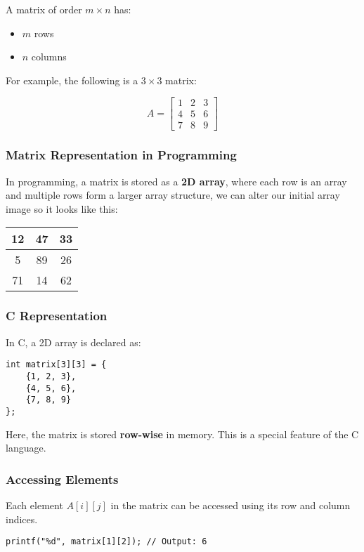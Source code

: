 \documentclass[a4paper,12pt]{article}
\begin{document}
A matrix of order \( m \times n \) has:

\begin{itemize}
    \item \( m \) rows
    \item \( n \) columns
\end{itemize}
For example, the following is a \( 3 \times 3 \) matrix:

\[
A =
\begin{bmatrix}
    1 & 2 & 3 \\
    4 & 5 & 6 \\
    7 & 8 & 9
\end{bmatrix}
\]

\subsubsection{Matrix Representation in Programming}
In programming, a matrix is stored as a \textbf{2D array}, where each row is an array and multiple rows form a larger array structure, we can alter our initial array image so it looks like this:

\begin{center}
\renewcommand{\arraystretch}{1.5}
\begin{tabular}{|c|c|c|}
\hline
12 & 47 & 33 \\
\hline
5  & 89 & 26 \\
\hline
71 & 14 & 62 \\
\hline
\end{tabular}
\end{center}

\subsubsection{C Representation}
In C, a 2D array is declared as:
\begin{verbatim}
int matrix[3][3] = {
    {1, 2, 3},
    {4, 5, 6},
    {7, 8, 9}
};
\end{verbatim}

Here, the matrix is stored \textbf{row-wise} in memory. This is a special feature of the C language. 

\subsubsection{Accessing Elements}
Each element \( A[i][j] \) in the matrix can be accessed using its row and column indices.

\begin{verbatim}
printf("%d", matrix[1][2]); // Output: 6
\end{verbatim}
\end{document}
